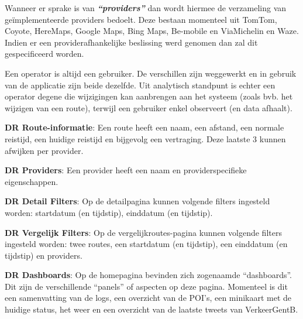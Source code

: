 Wanneer er sprake is van \textbf{\textit{``providers''}} dan wordt hiermee de verzameling van geïmplementeerde providers bedoelt. Deze bestaan momenteel uit TomTom, Coyote, HereMaps, Google Maps, Bing Maps, Be-mobile en ViaMichelin en Waze. Indien er een providerafhankelijke beslissing werd genomen dan zal dit gespecificeerd worden.

Een operator is altijd een gebruiker. De verschillen zijn weggewerkt en in gebruik van de applicatie zijn beide dezelfde. Uit analytisch standpunt is echter een operator degene die wijzigingen kan aanbrengen aan het systeem (zoals bvb. het wijzigen van een route), terwijl een gebruiker enkel observeert (en data afhaalt). 

\textbf{DR Route-informatie}: Een route heeft een naam, een afstand, een normale reistijd, een huidige reistijd en bijgevolg een vertraging. Deze laatste 3 kunnen afwijken per provider.

\textbf{DR Providers}: Een provider heeft een naam en providerspecifieke eigenschappen.

\textbf{DR Detail Filters}: Op de detailpagina kunnen volgende filters ingesteld worden: startdatum (en tijdstip), einddatum (en tijdstip).

\textbf{DR Vergelijk Filters}: Op de vergelijkroutes-pagina kunnen volgende filters ingesteld worden: twee routes, een startdatum (en tijdstip), een einddatum (en tijdstip) en providers.

\textbf{DR Dashboards}: Op de homepagina bevinden zich zogenaamde ``dashboards''. Dit zijn de verschillende ``panels'' of aspecten op deze pagina. Momenteel is dit een samenvatting van de logs, een overzicht van de POI's, een minikaart met de huidige status, het weer en een overzicht van de laatste tweets van VerkeerGentB.
